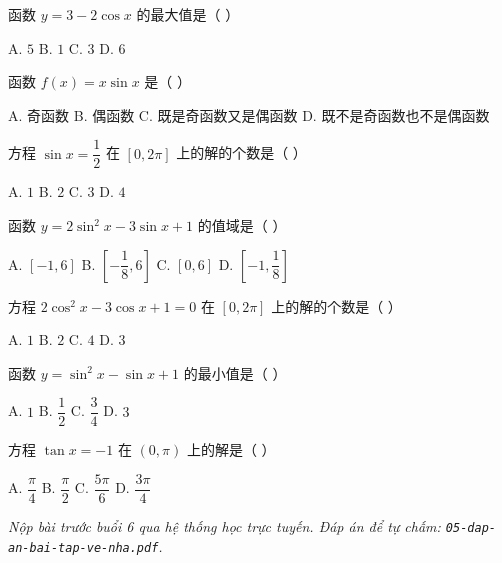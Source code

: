 \documentclass[11pt, a4paper]{article}
\begin{document}
\begin{baitap}[9]
函数 $y = 3 - 2\cos x$ 的最大值是（ ）
\par\vspace{3pt}
\noindent A. $5$ \quad B. $1$ \quad C. $3$ \quad D. $6$
\end{baitap}

\begin{baitap}[10]
函数 $f(x) = x\sin x$ 是（ ）
\par\vspace{3pt}
\noindent A. 奇函数 \quad B. 偶函数 \quad C. 既是奇函数又是偶函数 \quad D. 既不是奇函数也不是偶函数
\end{baitap}

\begin{baitap}[11]
方程 $\sin x = \dfrac{1}{2}$ 在 $[0, 2\pi]$ 上的解的个数是（ ）
\par\vspace{3pt}
\noindent A. $1$ \quad B. $2$ \quad C. $3$ \quad D. $4$
\end{baitap}

\begin{baitap}[12]
函数 $y = 2\sin^2 x - 3\sin x + 1$ 的值域是（ ）
\par\vspace{3pt}
\noindent A. $[-1, 6]$ \quad B. $\left[-\dfrac{1}{8}, 6\right]$ \quad C. $[0, 6]$ \quad D. $\left[-1, \dfrac{1}{8}\right]$
\end{baitap}

\begin{baitap}[13]
方程 $2\cos^2 x - 3\cos x + 1 = 0$ 在 $[0, 2\pi]$ 上的解的个数是（ ）
\par\vspace{3pt}
\noindent A. $1$ \quad B. $2$ \quad C. $4$ \quad D. $3$
\end{baitap}

\begin{baitap}[14]
函数 $y = \sin^2 x - \sin x + 1$ 的最小值是（ ）
\par\vspace{3pt}
\noindent A. $1$ \quad B. $\dfrac{1}{2}$ \quad C. $\dfrac{3}{4}$ \quad D. $3$
\end{baitap}

\begin{baitap}[15]
方程 $\tan x = -1$ 在 $(0, \pi)$ 上的解是（ ）
\par\vspace{3pt}
\noindent A. $\dfrac{\pi}{4}$ \quad B. $\dfrac{\pi}{2}$ \quad C. $\dfrac{5\pi}{6}$ \quad D. $\dfrac{3\pi}{4}$
\end{baitap}

\vspace{0.3cm}
\noindent\emph{Nộp bài trước buổi 6 qua hệ thống học trực tuyến. Đáp án để tự chấm: \texttt{05-dap-an-bai-tap-ve-nha.pdf}.}
\end{document}
